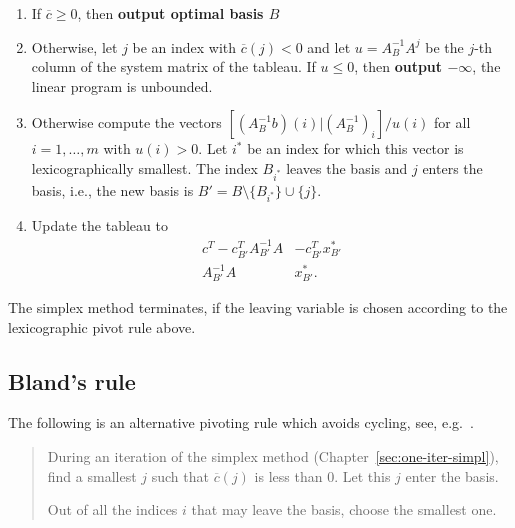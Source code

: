 \begin{enumerate}
\item If $\overline{c}\geq0$, then {\bf output optimal basis $B$}
  \label{c:item:3}
\item Otherwise, let $j$ be an index with $\overline{c}(j)<0$ and let
  $u = A_B^{-1}A^j$ be the $j$-th column of the system matrix of the
  tableau. If $u\leq0$, then {\bf output $-\infty$}, the linear program is
  unbounded. \label{c:item:7}
\item Otherwise compute the 
  vectors $[ (A_B^{-1} b) (i) | (A_B^{-1})_i] / u(i)$ 
  for all $i =
  1,\ldots,m$ with $u(i)>0$. Let $i^*$ be an index for which this vector
  is lexicographically smallest. 
  The index $B_{i^*}$ leaves the basis and $j$ enters the  basis, i.e., the new basis is $B' = B \setminus\{B_{i^*}\} \cup \{j\}$. 
\item Update the tableau to 
  \begin{displaymath}    
  \begin{array}{c|c}
    c^T - c_{B'}^TA_{B'}^{-1}A  & -c_{B'}^Tx^*_{B'} \\ \hline 
    A_{B'}^{-1}A        & x^*_{B'}.
  \end{array}
\end{displaymath}
\end{enumerate}


\begin{theorem}
  \label{thr:3}
  The simplex method terminates, if the leaving variable is chosen
  according to the lexicographic pivot rule above. 
\end{theorem}


\subsection{Bland's rule}

The following is an alternative pivoting rule which avoids cycling,
see, e.g.~\cite{Chvatal83}. 

\begin{quote}
  During an iteration of the simplex method
  (Chapter~\ref{sec:one-iter-simpl}), find a smallest $j$ such  
  that $\overline{c}(j)$ is less than $0$. Let this $j$ enter the
  basis. 
  
  Out of all the indices $i$ that may leave the basis, choose the
  smallest one. 
\end{quote}

%

